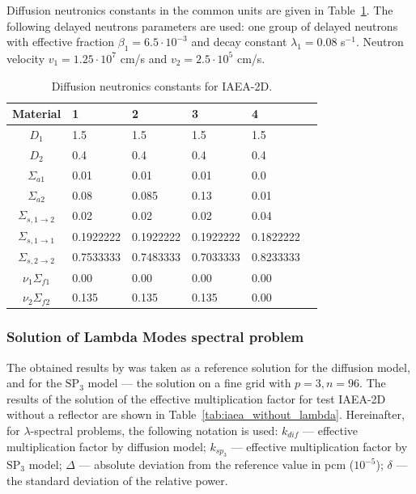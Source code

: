 \documentclass[authoryear]{elsarticle}
\begin{document}
Diffusion neutronics constants in the common units are given in Table~\ref{tab:iaea}.
The following delayed neutrons parameters are used: one group of delayed neutrons with effective fraction $\beta_1 = 6.5\cdot10^{-3}$ and decay constant $\lambda_1 = 0.08$ s$^{-1}$. 
Neutron velocity  $v_1 = 1.25 \cdot 10^7$ cm/s and $v_2 = 2.5 \cdot 10^5$ cm/s.

\begin{table}[htp]
\caption{Diffusion neutronics constants for IAEA-2D.}
\label{tab:iaea}
\begin{center}
\begin{tabular}{c l l l l l}
\hline
Material & 1 & 2 & 3 & 4\\
\hline 
$D_1$ & 1.5 & 1.5 & 1.5 & 1.5\\
$D_2$ & 0.4 & 0.4 & 0.4 & 0.4\\
$\Sigma_{a1}$ & 0.01 & 0.01 & 0.01 & 0.0\\
$\Sigma_{a2}$ & 0.08 & 0.085 & 0.13 & 0.01\\
$\Sigma_{s,1\rightarrow2}$ & 0.02 & 0.02 & 0.02 & 0.04\\
$\Sigma_{s,1\rightarrow1}$ & 0.1922222 & 0.1922222 & 0.1922222 & 0.1822222\\
$\Sigma_{s,2\rightarrow2}$ & 0.7533333 & 0.7483333 & 0.7033333 & 0.8233333\\
$\nu_1\Sigma_{f1}$ & 0.00 & 0.00 & 0.00 & 0.00\\
$\nu_2\Sigma_{f2}$ & 0.135 & 0.135 & 0.135 & 0.00\\
\hline
\end{tabular}
\end{center}
\end{table}

\subsubsection{Solution of Lambda Modes spectral problem}
The obtained results by \citep{avvakumov2014} was taken as a reference solution for the diffusion model, and for the $\mathrm{SP_3}$ model --- the solution on a fine grid with $p = 3, n = 96$.
The results of the solution of the effective multiplication factor for test IAEA-2D without a reflector are shown in Table~\ref{tab:iaea_without_lambda}.
Hereinafter, for $\lambda$-spectral problems, the following notation is used: $k_{dif}$ --- effective multiplication factor by diffusion model; $k_{sp_3}$ --- effective multiplication factor by $\mathrm{SP_3}$ model; $\Delta$ --- absolute deviation from the reference value in pcm ($10^{-5}$); $\delta$ --- the standard deviation of the relative power. %
\end{document}
